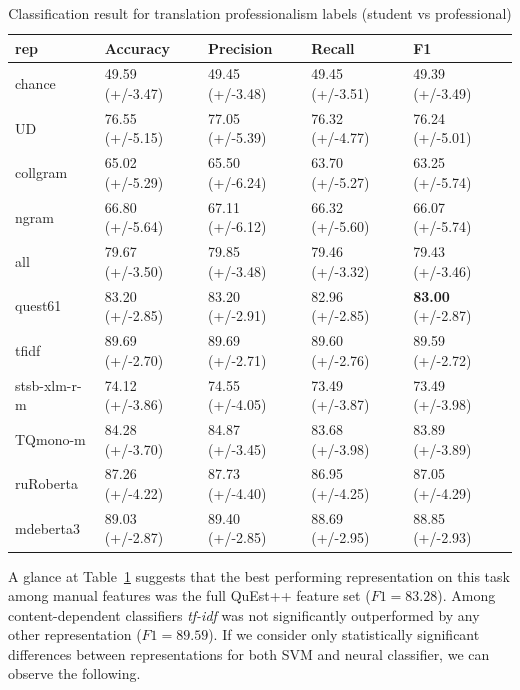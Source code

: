 \begin{table}[H]
	\centering
	\begin{tabular}{l|llll}
		\toprule
		rep   & Accuracy        & Precision       & Recall          & F1              \\
		\midrule
		chance          & 49.59 (+/-3.47) & 49.45 (+/-3.48) & 49.45 (+/-3.51) & 49.39 (+/-3.49) \\
		\midrule
		UD              & 76.55 (+/-5.15) & 77.05 (+/-5.39) & 76.32 (+/-4.77) & 76.24 (+/-5.01) \\
		collgram        & 65.02 (+/-5.29) & 65.50 (+/-6.24) & 63.70 (+/-5.27) & 63.25 (+/-5.74) \\
		ngram           & 66.80 (+/-5.64) & 67.11 (+/-6.12) & 66.32 (+/-5.60) & 66.07 (+/-5.74) \\
		all             & 79.67 (+/-3.50) & 79.85 (+/-3.48) & 79.46 (+/-3.32) & 79.43 (+/-3.46) \\
		\midrule
		quest61         & 83.20 (+/-2.85) & 83.20 (+/-2.91) & 82.96 (+/-2.85) & \textbf{83.00} (+/-2.87) \\
		\midrule
		tfidf           & 89.69 (+/-2.70) & 89.69 (+/-2.71) & 89.60 (+/-2.76) & \boxit{0.4in} 89.59 (+/-2.72) \\
		stsb-xlm-r-m          & 74.12 (+/-3.86) & 74.55 (+/-4.05) & 73.49 (+/-3.87) & 73.49 (+/-3.98) \\
		TQmono-m        & 84.28 (+/-3.70) & 84.87 (+/-3.45) & 83.68 (+/-3.98) & 83.89 (+/-3.89) \\
		ruRoberta & 87.26 (+/-4.22) & 87.73 (+/-4.40) & 86.95 (+/-4.25) & 87.05 (+/-4.29) \\
		mdeberta3  & 89.03 (+/-2.87) & 89.40 (+/-2.85) & 88.69 (+/-2.95) & 88.85 (+/-2.93)\\
		\bottomrule
	\end{tabular}
	\caption{\label{tab:stu-pro}Classification result for translation professionalism labels (student vs professional)}
\end{table}

A glance at Table~\ref{tab:stu-pro} suggests that the best performing representation on this task among manual features was the full QuEst++ feature set ($F1=83.28$). Among content-dependent classifiers \textit{tf-idf} was not significantly outperformed by any other representation ($F1=89.59$). If we consider only statistically significant differences between representations for both SVM and neural classifier, we can observe the following. 

